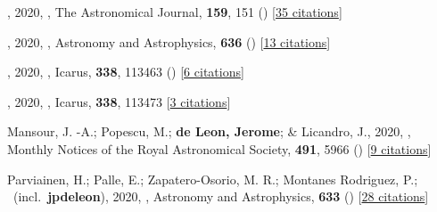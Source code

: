 \item[{\color{numcolor}\scriptsize119}] , 2020, , The Astronomical Journal, \textbf{159}, 151 () [\href{https://ui.adsabs.harvard.edu/abs/2020AJ....159..151S}{35 citations}]

\item[{\color{numcolor}\scriptsize118}] , 2020, , Astronomy and Astrophysics, \textbf{636} () [\href{https://ui.adsabs.harvard.edu/abs/2020A&A...636A..89H}{13 citations}]

\item[{\color{numcolor}\scriptsize117}] , 2020, , Icarus, \textbf{338}, 113463 () [\href{https://ui.adsabs.harvard.edu/abs/2020Icar..33813463S}{6 citations}]

\item[{\color{numcolor}\scriptsize116}] , 2020, , Icarus, \textbf{338}, 113473 [\href{https://ui.adsabs.harvard.edu/abs/2020Icar..33813473D}{3 citations}]

\item[{\color{numcolor}\scriptsize115}] Mansour, J. -A.; Popescu, M.; \textbf{de Leon, Jerome}; \& Licandro, J., 2020, , Monthly Notices of the Royal Astronomical Society, \textbf{491}, 5966 () [\href{https://ui.adsabs.harvard.edu/abs/2020MNRAS.491.5966M}{9 citations}]

\item[{\color{numcolor}\scriptsize114}] Parviainen, H.; Palle, E.; Zapatero-Osorio, M. R.; Montanes Rodriguez, P.; \etal\ (incl.\ \textbf{jpdeleon}), 2020, , Astronomy and Astrophysics, \textbf{633} () [\href{https://ui.adsabs.harvard.edu/abs/2020A&A...633A..28P}{28 citations}]

